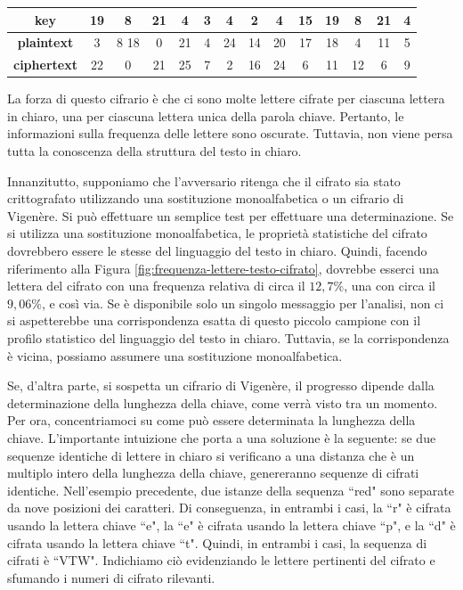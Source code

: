 \begin{table}[H]
    \centering
    \begin{tabular}{|c|ccccccccccccc|}
    \hline
    \textbf{key} & 19 & 8 & 21 & 4 & 3 & 4 & 2 & 4 & 15 & 19 & 8 & 21 & 4 \\
    \hline
    \textbf{plaintext} & 3 & 8 18 & 0 & 21 & 4 & 24 & 14 & 20 & 17 & 18 & 4 & 11 & 5 \\
    \hline
    \textbf{ciphertext} & 22 & 0 & 21 & 25 & 7 & 2 & 16 & 24 & 6 & 11 & 12 & 6 & 9 \\
    \hline
    \end{tabular}
\end{table}
La forza di questo cifrario è che ci sono molte lettere cifrate per ciascuna lettera in chiaro,
una per ciascuna lettera unica della parola chiave. Pertanto, le informazioni sulla frequenza delle
lettere sono oscurate. Tuttavia, non viene persa tutta la conoscenza della struttura del testo in chiaro.

Innanzitutto, supponiamo che l'avversario ritenga che il cifrato sia stato crittografato utilizzando
una sostituzione monoalfabetica o un cifrario di Vigenère. Si può effettuare un semplice test per
effettuare una determinazione. Se si utilizza una sostituzione monoalfabetica, le proprietà statistiche
del cifrato dovrebbero essere le stesse del linguaggio del testo in chiaro. Quindi, facendo riferimento
alla Figura \ref{fig:frequenza-lettere-testo-cifrato}, dovrebbe esserci una lettera del cifrato con una
frequenza relativa di circa il $12,7\%$,
una con circa il $9,06\%$, e così via. Se è disponibile solo un singolo messaggio per l'analisi, non
ci si aspetterebbe una corrispondenza esatta di questo piccolo campione con il profilo statistico del
linguaggio del testo in chiaro. Tuttavia, se la corrispondenza è vicina, possiamo assumere una
sostituzione monoalfabetica.

Se, d'altra parte, si sospetta un cifrario di Vigenère, il progresso dipende dalla determinazione della
lunghezza della chiave, come verrà visto tra un momento. Per ora, concentriamoci su come può essere
determinata la lunghezza della chiave. L'importante intuizione che porta a una soluzione è la seguente:
se due sequenze identiche di lettere in chiaro si verificano a una distanza che è un multiplo intero della
lunghezza della chiave, genereranno sequenze di cifrati identiche. Nell'esempio precedente, due istanze
della sequenza ``red" sono separate da nove posizioni dei caratteri. Di conseguenza, in entrambi i casi,
la ``r" è cifrata usando la lettera chiave ``e", la ``e" è cifrata usando la lettera chiave ``p", e la ``d" è
cifrata usando la lettera chiave ``t". Quindi, in entrambi i casi, la sequenza di cifrati è ``VTW".
Indichiamo ciò evidenziando le lettere pertinenti del cifrato e sfumando i numeri di cifrato rilevanti.


